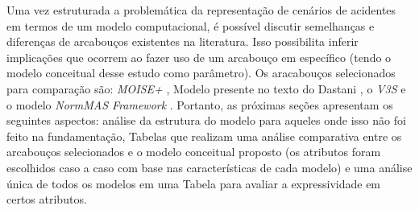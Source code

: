 Uma vez estruturada a problemática da representação de cenários de acidentes em termos de um modelo computacional, é possível discutir semelhanças e diferenças de arcabouços existentes na literatura. Isso possibilita inferir implicações que ocorrem ao fazer uso de um arcabouço em específico (tendo o modelo conceitual desse estudo como parâmetro). Os aracabouços selecionados para comparação são: \textit{MOISE+} \cite{moiseframework}, Modelo presente no texto do Dastani \cite{dastaniframework}, o \textit{V3S} \cite{v3sframework} e o modelo \textit{NormMAS Framework} \cite{normas}. Portanto, as próximas seções apresentam os seguintes aspectos: análise da estrutura do modelo para aqueles onde isso não foi feito na fundamentação, Tabelas que realizam uma análise comparativa entre os arcabouços selecionados e o modelo conceitual proposto (os atributos foram escolhidos caso a caso com base nas características de cada modelo) e uma análise única de todos os modelos em uma Tabela para avaliar a expressividade em certos atributos.